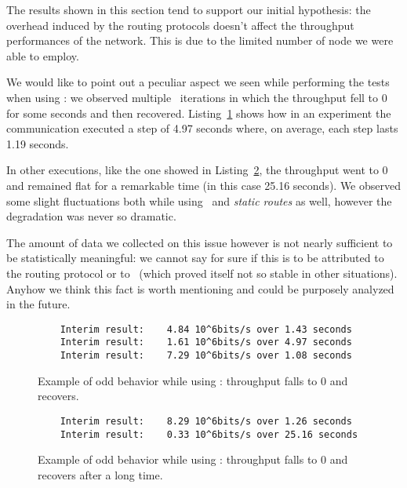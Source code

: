     The results shown in this section tend to support our initial
    hypothesis: the overhead induced by the routing protocols doesn't
    affect the throughput performances of the network. This is due to the
    limited number of node we were able to employ.

    We would like to point out a peculiar
    aspect we seen while performing the tests when using \olsr: we
    observed multiple \netperf\ iterations in which the throughput fell
    to 0 for some seconds and then recovered.
    Listing~\ref{lst:netperf-olsr-recover} shows how in an experiment the
    communication executed a step of 4.97 seconds where, on average, each
    step lasts 1.19 seconds.

    In other executions, like the one showed in
    Listing~\ref{lst:netperf-olsr-zero}, the throughput went to 0 and
    remained flat for a remarkable time (in this case 25.16 seconds).
    We observed some slight fluctuations both while using \batman\ and
    \emph{static routes} as well, however the degradation was never so
    dramatic.

    The amount of data we collected on this issue however is not
    nearly sufficient to be statistically meaningful: we cannot say for sure if this
    is to be attributed to the routing protocol or to \netperf\ (which
    proved itself not so stable in other situations). Anyhow we
    think this fact is worth mentioning and could be purposely analyzed
    in the future.

    \begin{figure}[bthp]
    \begin{lstlisting}
    Interim result:    4.84 10^6bits/s over 1.43 seconds
    Interim result:    1.61 10^6bits/s over 4.97 seconds
    Interim result:    7.29 10^6bits/s over 1.08 seconds
    \end{lstlisting}
    \caption{Example of odd behavior while using \olsr: throughput falls
             to 0 and recovers.}
    \label{lst:netperf-olsr-recover}
    \end{figure}

    \begin{figure}[bthp]
    \begin{lstlisting}
    Interim result:    8.29 10^6bits/s over 1.26 seconds
    Interim result:    0.33 10^6bits/s over 25.16 seconds
    \end{lstlisting}
    \caption{Example of odd behavior while using \olsr: throughput falls
             to 0 and recovers after a long time.}
    \label{lst:netperf-olsr-zero}
    \end{figure}
